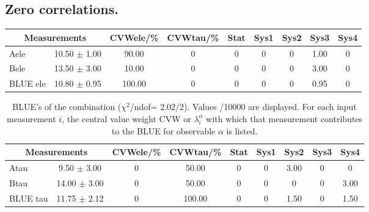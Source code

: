 \subsection{Zero correlations.}
\begin{table}[H]
\scriptsize
\begin{center}
\renewcommand{\arraystretch}{1.1}
\begin{tabular}{|lc|c|c|ccccc|}
\hline
\multicolumn{2}{|c|}{Measurements} & CVW{\tiny ele}/\%  & CVW{\tiny tau}/\%  & {\tiny Stat} & {\tiny Sys1} & {\tiny Sys2} & {\tiny Sys3} & {\tiny Sys4}\\
\hline
Aele &      10.50 $\pm$       1.00 &      90.00 &  0 &  0 &  0 &  0 &       1.00 &  0\\
Bele &      13.50 $\pm$       3.00 &      10.00 &  0 &  0 &  0 &  0 &       3.00 &  0\\
\hline
BLUE {\tiny ele} &      10.80 $\pm$       0.95 &     100.00 &  0 &  0 &  0 &  0 &       0.95 &  0\\
\hline
\end{tabular}
\renewcommand{\arraystretch}{1}
\end{center}
\end{table}
\vspace*{-0.5cm}
\begin{table}[H]
\scriptsize
\begin{center}
\renewcommand{\arraystretch}{1.1}
\begin{tabular}{|lc|c|c|ccccc|}
\hline
\multicolumn{2}{|c|}{Measurements} & CVW{\tiny ele}/\%  & CVW{\tiny tau}/\%  & {\tiny Stat} & {\tiny Sys1} & {\tiny Sys2} & {\tiny Sys3} & {\tiny Sys4}\\
\hline
Atau &       9.50 $\pm$       3.00 &  0 &      50.00 &  0 &  0 &       3.00 &  0 &  0\\
Btau &      14.00 $\pm$       3.00 &  0 &      50.00 &  0 &  0 &  0 &  0 &       3.00\\
\hline
BLUE {\tiny tau} &      11.75 $\pm$       2.12 &  0 &     100.00 &  0 &  0 &       1.50 &  0 &       1.50\\
\hline
\end{tabular}
\caption{BLUE's of the combination ($\chi^2$/ndof=      2.02/2).
 Values /10000 are displayed. For each input measurement $i$, the central value weight CVW or $\lambda_i^\alpha$ with which that measurement contributes to the BLUE for observable $\alpha$ is listed.}
\renewcommand{\arraystretch}{1}
\end{center}
\end{table}
